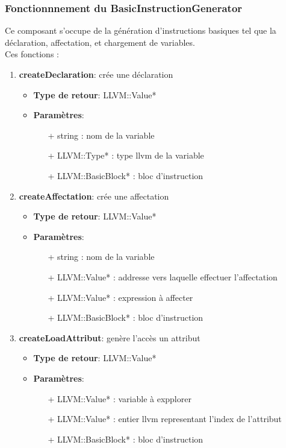 \documentclass{article}
\begin{document}
   \subsubsection{Fonctionnnement du BasicInstructionGenerator}

   Ce composant s'occupe de la génération d'instructions basiques tel que la déclaration, affectation, et chargement de variables. \\
   Ces fonctions : \

  \begin{enumerate}
  \item \textbf{createDeclaration}: crée une déclaration
  \begin{itemize}
    \item \textbf{Type de retour}: LLVM::Value*
    \item \textbf{Paramètres}:
    \begin{enumerate}
      \item[+] string : nom de la variable
      \item[+] LLVM::Type* : type llvm de la variable
      \item[+] LLVM::BasicBlock* : bloc d'instruction
    \end{enumerate}
  \end{itemize}

  \item \textbf{createAffectation}: crée une affectation
  \begin{itemize}
    \item \textbf{Type de retour}: LLVM::Value*
    \item \textbf{Paramètres}:
    \begin{enumerate}
      \item[+] string : nom de la variable
      \item[+] LLVM::Value* : addresse vers laquelle effectuer l'affectation
      \item[+] LLVM::Value* : expression à affecter
      \item[+] LLVM::BasicBlock* : bloc d'instruction
    \end{enumerate}
  \end{itemize}

  \item \textbf{createLoadAttribut}: genère l'accès un attribut 
   \begin{itemize}
    \item \textbf{Type de retour}: LLVM::Value*
    \item \textbf{Paramètres}:
    \begin{enumerate}
      \item[+] LLVM::Value* : variable à expplorer
      \item[+] LLVM::Value* : entier llvm representant l'index de l'attribut
      \item[+] LLVM::BasicBlock* : bloc d'instruction
    \end{enumerate}


\end{itemize}
\end{enumerate}
\end{document}
